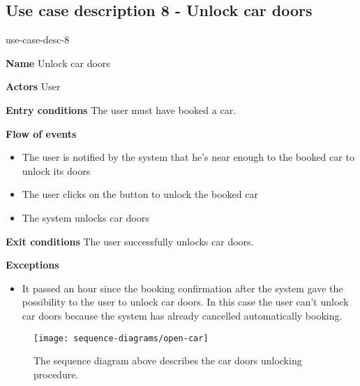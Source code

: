 \subsection{Use case description 8 - Unlock car doors}
\begin{labeling}{use-case-desc-8}
	\item[\textbf{Name}] Unlock car doors
	\item[\textbf{Actors}] User
	\item[\textbf{Entry conditions}] The user must have booked a car.
	\item[\textbf{Flow of events}]
		\begin{itemize}
			\item[]
			\item The user is notified by the system that he's near enough to the booked car to unlock its doors
			\item The user clicks on the button to unlock the booked car
			\item The system unlocks car doors
		\end{itemize}
	\item[\textbf{Exit conditions}] The user successfully unlocks car doors.
	\item[\textbf{Exceptions}]
		\begin{itemize}
			\item[]
			\item It passed an hour since the booking confirmation after the system gave the possibility to the user to unlock car doors. In this case the user can't unlock car doors because the system has already cancelled automatically booking.  
		\end{itemize}
\end{labeling}
\begin{figure}[H]
	\centering
	\texttt{[image: sequence-diagrams/open-car]}
	\caption[Sequence diagram - Unlock car doors]{The sequence diagram above describes the car doors unlocking procedure.}
	\label{fig:open-car-sequence-diagram}
\end{figure}
\clearpage

